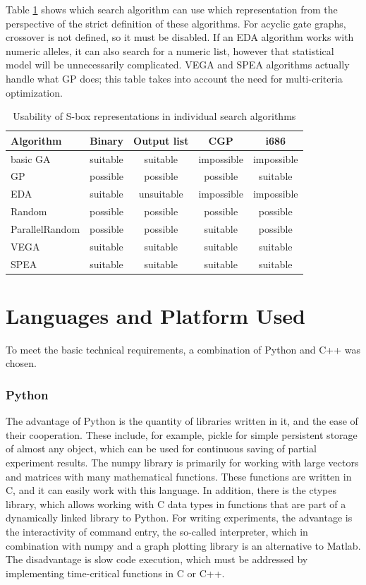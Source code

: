 Table \ref{tabReprezantationUsability} shows which search algorithm can use which representation from the perspective of the strict definition
of these algorithms.
For acyclic gate graphs, crossover is not defined, so it must be disabled.
If an EDA algorithm works with numeric alleles, it can also search for a numeric list, however
that statistical model will be unnecessarily complicated. VEGA and SPEA algorithms actually handle what GP does;
this table takes into account the need for multi-criteria optimization.
\begin{table}[t]
  \begin{center}
     \begin{tabular}{| l | c | c | c | c |}
     \hline
     Algorithm & Binary & Output list & CGP & i686 \\ \hline
     basic GA & suitable & suitable & impossible & impossible \\ \hline
     GP & possible & possible & possible & suitable \\ \hline
     EDA & suitable & unsuitable & impossible & impossible \\ \hline
     Random & possible & possible & possible & possible \\ \hline
     ParallelRandom & possible & possible & suitable & possible \\ \hline
     VEGA & suitable & suitable & suitable & suitable \\ \hline
     SPEA & suitable & suitable & suitable & suitable \\ \hline
     \end{tabular}
     \caption{Usability of S-box representations in individual search algorithms}
     \label{tabReprezantationUsability}
  \end{center}
\end{table}

\section{Languages and Platform Used}
To meet the basic technical requirements, a combination of Python and C++ was chosen.


\subsubsection{Python}
The advantage of Python is the quantity of libraries written in it, and the ease of their cooperation.
These include, for example, pickle for simple persistent storage of almost any object, which
can be used for continuous saving of partial experiment results.
The numpy library is primarily for working with large vectors and matrices with many mathematical functions.
These functions are written in C, and it can easily work with this language.
In addition, there is the ctypes library, which allows working with C data types
in functions that are part of a dynamically linked library to Python.
For writing experiments, the advantage is the interactivity of command entry, the so-called 
interpreter, which in combination with numpy and a graph plotting library is an alternative to
Matlab.
The disadvantage is slow code execution, which must be addressed by implementing time-critical functions in C or
C++.

